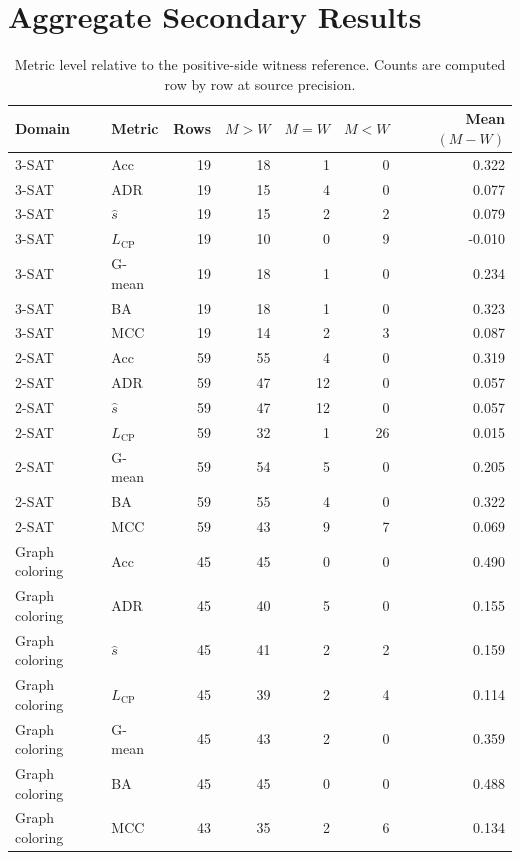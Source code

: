 \documentclass[acmsmall,screen,review,anonymous]{acmart}
\begin{document}
\section{Aggregate Secondary Results}
\label{sec:supp-aggregate}


\begin{table}[t]
\centering
\caption{Metric level relative to the positive-side witness reference. Counts are computed row by row at source precision.}
\label{tab:supp-levels}
\renewcommand{\arraystretch}{1.06}
\begin{tabular}{llrrrrr}
\toprule
Domain & Metric & Rows & $M>W$ & $M=W$ & $M<W$ & Mean $(M-W)$\\
\midrule
3-SAT & Acc & 19 & 18 & 1 & 0 & 0.322 \\
3-SAT & ADR & 19 & 15 & 4 & 0 & 0.077 \\
3-SAT & $\hat{s}$ & 19 & 15 & 2 & 2 & 0.079 \\
3-SAT & $L_{\mathrm{CP}}$ & 19 & 10 & 0 & 9 & -0.010 \\
3-SAT & G-mean & 19 & 18 & 1 & 0 & 0.234 \\
3-SAT & BA & 19 & 18 & 1 & 0 & 0.323 \\
3-SAT & MCC & 19 & 14 & 2 & 3 & 0.087 \\
\midrule
2-SAT & Acc & 59 & 55 & 4 & 0 & 0.319 \\
2-SAT & ADR & 59 & 47 & 12 & 0 & 0.057 \\
2-SAT & $\hat{s}$ & 59 & 47 & 12 & 0 & 0.057 \\
2-SAT & $L_{\mathrm{CP}}$ & 59 & 32 & 1 & 26 & 0.015 \\
2-SAT & G-mean & 59 & 54 & 5 & 0 & 0.205 \\
2-SAT & BA & 59 & 55 & 4 & 0 & 0.322 \\
2-SAT & MCC & 59 & 43 & 9 & 7 & 0.069 \\
\midrule
Graph coloring & Acc & 45 & 45 & 0 & 0 & 0.490 \\
Graph coloring & ADR & 45 & 40 & 5 & 0 & 0.155 \\
Graph coloring & $\hat{s}$ & 45 & 41 & 2 & 2 & 0.159 \\
Graph coloring & $L_{\mathrm{CP}}$ & 45 & 39 & 2 & 4 & 0.114 \\
Graph coloring & G-mean & 45 & 43 & 2 & 0 & 0.359 \\
Graph coloring & BA & 45 & 45 & 0 & 0 & 0.488 \\
Graph coloring & MCC & 43 & 35 & 2 & 6 & 0.134 \\
\bottomrule
\end{tabular}
\end{table}
\end{document}
